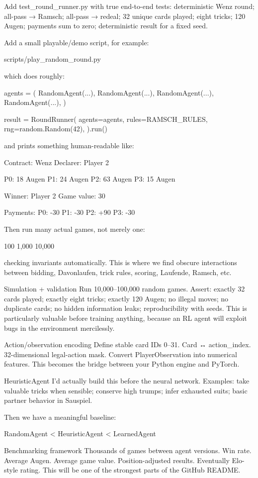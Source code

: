 Add test_round_runner.py with true end-to-end tests:
deterministic Wenz round;
all-pass → Ramsch;
all-pass → redeal;
32 unique cards played;
eight tricks;
120 Augen;
payments sum to zero;
deterministic result for a fixed seed.

Add a small playable/demo script, for example:

scripts/play_random_round.py

which does roughly:

agents = (
    RandomAgent(...),
    RandomAgent(...),
    RandomAgent(...),
    RandomAgent(...),
)

result = RoundRunner(
    agents=agents,
    rules=RAMSCH_RULES,
    rng=random.Random(42),
).run()

and prints something human-readable like:

Contract: Wenz
Declarer: Player 2

P0: 18 Augen
P1: 24 Augen
P2: 63 Augen
P3: 15 Augen

Winner: Player 2
Game value: 30

Payments:
P0: -30
P1: -30
P2: +90
P3: -30

Then run many actual games, not merely one:

100
1,000
10,000

checking invariants automatically. This is where we find obscure interactions between bidding, Davonlaufen, trick rules, scoring, Laufende, Ramsch, etc.

Simulation + validation
Run 10,000–100,000 random games.
Assert:
exactly 32 cards played;
exactly eight tricks;
exactly 120 Augen;
no illegal moves;
no duplicate cards;
no hidden information leaks;
reproducibility with seeds.
This is particularly valuable before training anything, because an RL agent will exploit bugs in the environment mercilessly.


Action/observation encoding
Define stable card IDs 0–31.
Card ↔ action_index.
32-dimensional legal-action mask.
Convert PlayerObservation into numerical features.
This becomes the bridge between your Python engine and PyTorch.


HeuristicAgent
I’d actually build this before the neural network.
Examples:
take valuable tricks when sensible;
conserve high trumps;
infer exhausted suits;
basic partner behavior in Sauspiel.

Then we have a meaningful baseline:

RandomAgent < HeuristicAgent < LearnedAgent


Benchmarking framework
Thousands of games between agent versions.
Win rate.
Average Augen.
Average game value.
Position-adjusted results.
Eventually Elo-style rating.
This will be one of the strongest parts of the GitHub README.